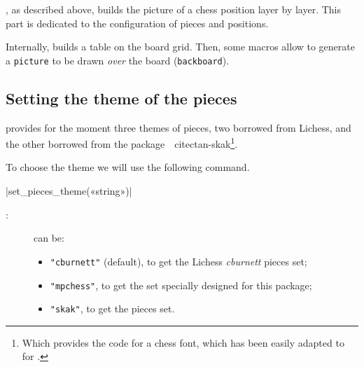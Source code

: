 \documentclass[english]{ltxdoc}
\begin{document}
\mpchess, as described above, builds the picture of a chess position
layer by layer. This part is dedicated to the configuration of pieces and
positions.

Internally, \mpchess builds a table on the board grid. Then, some
macros allow to generate a \lstinline+picture+ to be drawn \emph{over} the board (\lstinline+backboard+).

\subsection{Setting the theme of the pieces}

\mpchess provides for the moment three themes of pieces, two borrowed from
Lichess, and the other borrowed from the
package~~cite{ctan-skak}\footnote{Which provides the \MF{} code
for a chess font, which has been easily adapted to \MP{} for \mpchess.}.

To choose the theme we will use the following command.

\commande|set_pieces_theme(«string»)|\smallskip

\begin{description}
  \item[:] can be:
\begin{itemize}
\item \lstinline+"cburnett"+ (default), to get the Lichess \emph{cburnett}
pieces set;
\item \lstinline+"mpchess"+, to get the set specially designed for this
package;
\item \lstinline+"skak"+, to get the 
pieces set.
\end{itemize}
\end{description}
\end{document}
